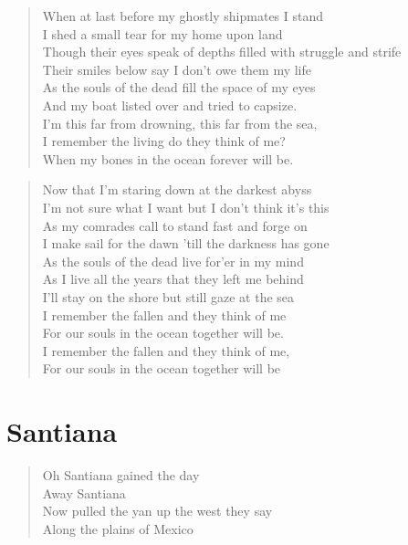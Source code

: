 \documentclass[8pt,twoside]{extarticle}
\newenvironment{xverse}{
	\interlinepenalty 10000
	\begin{verse}
	\begin{minipage}{\linewidth}
	\parskip 5pt
	\vspace{-6pt}
	}
	{
	\end{minipage}
	\end{verse}
	\penalty 0
	\vspace{-6pt}
	}
\begin{document}
\begin{xverse}
When at last before my ghostly shipmates I stand \\
I shed a small tear for my home upon land \\
Though their eyes speak of depths filled with struggle and strife \\
Their smiles below say I don't owe them my life \\
As the souls of the dead fill the space of my eyes \\
And my boat listed over and tried to capsize. \\
I'm this far from drowning, this far from the sea, \\
I remember the living do they think of me? \\
When my bones in the ocean forever will be. \\
\end{xverse}

\begin{xverse}
Now that I'm staring down at the darkest abyss \\
I'm not sure what I want but I don't think it's this \\
As my comrades call to stand fast and forge on \\
I make sail for the dawn 'till the darkness has gone \\
As the souls of the dead live for'er in my mind \\
As I live all the years that they left me behind \\
I'll stay on the shore but still gaze at the sea \\
I remember the fallen and they think of me \\
For our souls in the ocean together will be. \\
I remember the fallen and they think of me, \\
For our souls in the ocean together will be \\
\end{xverse}


\section{Santiana}

\begin{xverse}
Oh Santiana gained the day \\
Away Santiana \\
Now pulled the yan up the west they say \\
Along the plains of Mexico \\
\end{xverse}
\end{document}
